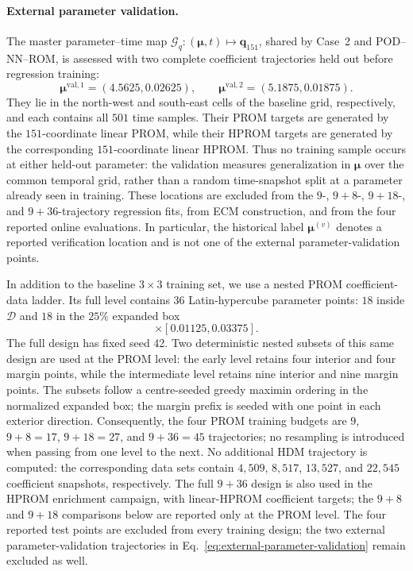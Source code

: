 \documentclass[11pt]{article}
\newcommand{\q}{\mathbf q}
\begin{document}
\paragraph{External parameter validation.}
The master parameter--time map
\(\mathcal G_q:(\bm\mu,t)\mapsto\q_{151}\), shared by Case~2 and
POD--NN--ROM, is assessed with two complete coefficient trajectories held out
before regression training:
\begin{equation}
\bm\mu^{\mathrm{val},1}=(4.5625,0.02625),\qquad
\bm\mu^{\mathrm{val},2}=(5.1875,0.01875).
\label{eq:external-parameter-validation}
\end{equation}
They lie in the north-west and south-east cells of the baseline grid,
respectively, and each contains all $501$ time samples.  Their PROM targets
are generated by the $151$-coordinate linear PROM, while their HPROM targets
are generated by the corresponding $151$-coordinate linear HPROM.  Thus no
training sample occurs at either held-out parameter: the validation measures
generalization in \(\bm\mu\) over the common temporal grid, rather than a
random time-snapshot split at a parameter already seen in training.  These
locations are excluded from the $9$-, $9+8$-, $9+18$-, and $9+36$-trajectory regression
fits, from ECM construction, and from the four reported online evaluations.  In
particular, the historical label \(\bm\mu^{(v)}\) denotes a reported
verification location and is not one of the external parameter-validation
points.

In addition to the baseline $3\times3$ training set, we use a nested PROM
coefficient-data ladder.  Its full level contains $36$ Latin-hypercube
parameter points: $18$ inside $\mathcal D$ and $18$ in the $25\%$ expanded box
\begin{equation}
  [3.9375,5.8125]\times[0.01125,0.03375].
\end{equation}
The full design has fixed seed 42.  Two deterministic nested subsets of this
same design are used at the PROM level: the early level retains four interior
and four margin points, while the intermediate level retains nine interior and
nine margin points.  The subsets follow a centre-seeded greedy maximin ordering
in the normalized expanded box; the margin prefix is seeded with one point in
each exterior direction.  Consequently, the four PROM training budgets are
$9$, $9+8=17$, $9+18=27$, and $9+36=45$ trajectories; no resampling is
introduced when passing from one level to the next.  No additional HDM
trajectory is computed: the corresponding data sets contain $4{,}509$,
$8{,}517$, $13{,}527$, and $22{,}545$ coefficient snapshots, respectively.
The full $9+36$ design is also used in the HPROM enrichment campaign, with
linear-HPROM coefficient targets; the $9+8$ and $9+18$ comparisons below are
reported only at the PROM level.  The four reported test points are excluded
from every training design; the two external parameter-validation trajectories in
Eq.~\eqref{eq:external-parameter-validation} remain excluded as well.
\end{document}
